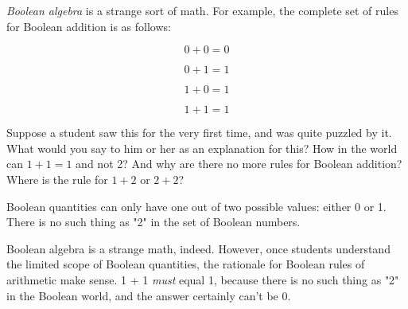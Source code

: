 

{\it Boolean algebra} is a strange sort of math.  For example, the complete set of rules for Boolean addition is as follows:

$$0 + 0 = 0$$

$$0 + 1 = 1$$

$$1 + 0 = 1$$

$$1 + 1 = 1$$

Suppose a student saw this for the very first time, and was quite puzzled by it.  What would you say to him or her as an explanation for this?  How in the world can $1 + 1 = 1$ and not 2?  And why are there no more rules for Boolean addition?  Where is the rule for $1 + 2$ or $2 + 2$?







Boolean quantities can only have one out of two possible values: either 0 or 1.  There is no such thing as "2" in the set of Boolean numbers.







Boolean algebra is a strange math, indeed.  However, once students understand the limited scope of Boolean quantities, the rationale for Boolean rules of arithmetic make sense.  1 + 1 {\it must} equal 1, because there is no such thing as "2" in the Boolean world, and the answer certainly can't be 0.




